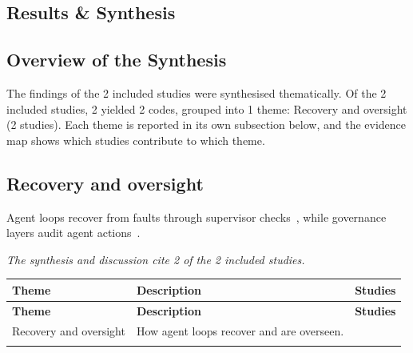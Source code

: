 \documentclass[10pt,a4paper]{article}
\begin{document}
\begin{multicols}{2}

\section{Results \& Synthesis}\label{sec:results-synthesis}

\subsection{Overview of the Synthesis}\label{sec:overview-of-the-synthesis}

The findings of the 2 included studies were synthesised thematically.
Of the 2 included studies, 2 yielded 2 codes, grouped into 1 theme: Recovery and oversight (2 studies).
Each theme is reported in its own subsection below, and the evidence map shows which studies contribute to which theme.

\subsection{Recovery and oversight}\label{sec:recovery-and-oversight}

Agent loops recover from faults through supervisor checks~\cite{doe2025agent}, while governance layers audit agent actions~\cite{lee2026agent}.

\par\smallskip\noindent\textit{The synthesis and discussion cite 2 of the 2 included studies.}

\end{multicols}

\vspace{6pt}
\begin{tabularx}{\textwidth}{>{\hsize}Y >{\hsize}Y >{\hsize}Y}
\caption{Evidence Map of the Thematic Synthesis}\label{tab:evidence-map}\\
\toprule
\textbf{Theme} & \textbf{Description} & \textbf{Studies} \\
\midrule
\endfirsthead%
\toprule
\textbf{Theme} & \textbf{Description} & \textbf{Studies} \\
\midrule
\endhead%
Recovery and oversight & How agent loops recover and are overseen. & {\cite{doe2025agent,lee2026agent}} \\ \addlinespace
\bottomrule
\end{tabularx}
\vspace{2pt}
\normalsize
\vspace{10pt}
\end{document}

